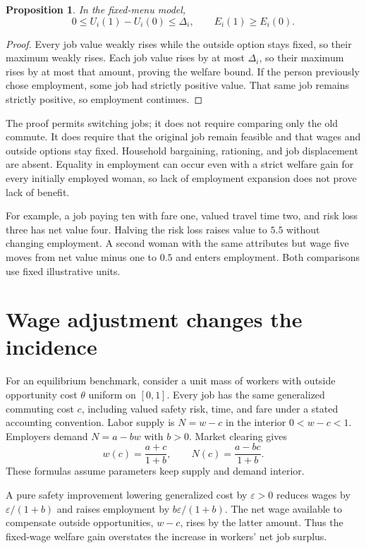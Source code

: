 \documentclass[11pt,a4paper]{article}
\newtheorem{proposition}[theorem]{Proposition}
\begin{document}
\begin{proposition}
In the fixed-menu model,
\[
 0\le U_i(1)-U_i(0)\le\Delta_i,\qquad E_i(1)\ge E_i(0).
 \tag{2}
\]
\end{proposition}
\begin{proof}
Every job value weakly rises while the outside option stays fixed, so their maximum weakly rises. Each job value rises by at most $\Delta_i$, so their maximum rises by at most that amount, proving the welfare bound. If the person previously chose employment, some job had strictly positive value. That same job remains strictly positive, so employment continues.
\end{proof}
The proof permits switching jobs; it does not require comparing only the old commute. It does require that the original job remain feasible and that wages and outside options stay fixed. Household bargaining, rationing, and job displacement are absent. Equality in employment can occur even with a strict welfare gain for every initially employed woman, so lack of employment expansion does not prove lack of benefit.

For example, a job paying ten with fare one, valued travel time two, and risk loss three has net value four. Halving the risk loss raises value to $5.5$ without changing employment. A second woman with the same attributes but wage five moves from net value minus one to $0.5$ and enters employment. Both comparisons use fixed illustrative units.
\section{Wage adjustment changes the incidence}
For an equilibrium benchmark, consider a unit mass of workers with outside opportunity cost $\theta$ uniform on $[0,1]$. Every job has the same generalized commuting cost $c$, including valued safety risk, time, and fare under a stated accounting convention. Labor supply is $N=w-c$ in the interior $0<w-c<1$. Employers demand $N=a-bw$ with $b>0$. Market clearing gives
\[
 w(c)=\frac{a+c}{1+b},\qquad
 N(c)=\frac{a-bc}{1+b}.
 \tag{3}
\]
These formulas assume parameters keep supply and demand interior.

A pure safety improvement lowering generalized cost by $\varepsilon>0$ reduces wages by $\varepsilon/(1+b)$ and raises employment by $b\varepsilon/(1+b)$. The net wage available to compensate outside opportunities, $w-c$, rises by the latter amount. Thus the fixed-wage welfare gain overstates the increase in workers' net job surplus.
\end{document}
